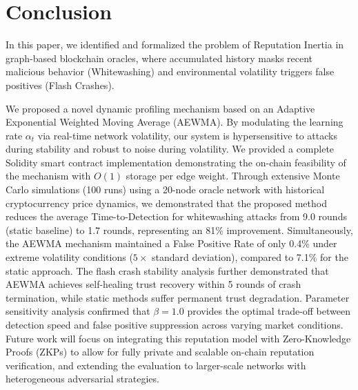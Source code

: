 \documentclass{ieeeaccess}
\begin{document}
\section{Conclusion}
\label{sec:conclusion}
In this paper, we identified and formalized the problem of Reputation Inertia in graph-based blockchain oracles, where accumulated history masks recent malicious behavior (Whitewashing) and environmental volatility triggers false positives (Flash Crashes).

We proposed a novel dynamic profiling mechanism based on an Adaptive Exponential Weighted Moving Average (AEWMA). By modulating the learning rate $\alpha_t$ via real-time network volatility, our system is hypersensitive to attacks during stability and robust to noise during volatility. We provided a complete Solidity smart contract implementation demonstrating the on-chain feasibility of the mechanism with $O(1)$ storage per edge weight. Through extensive Monte Carlo simulations (100 runs) using a 20-node oracle network with historical cryptocurrency price dynamics, we demonstrated that the proposed method reduces the average Time-to-Detection for whitewashing attacks from 9.0 rounds (static baseline) to 1.7 rounds, representing an 81\% improvement. Simultaneously, the AEWMA mechanism maintained a False Positive Rate of only 0.4\% under extreme volatility conditions ($5\times$ standard deviation), compared to 7.1\% for the static approach. The flash crash stability analysis further demonstrated that AEWMA achieves self-healing trust recovery within 5 rounds of crash termination, while static methods suffer permanent trust degradation. Parameter sensitivity analysis confirmed that $\beta=1.0$ provides the optimal trade-off between detection speed and false positive suppression across varying market conditions. Future work will focus on integrating this reputation model with Zero-Knowledge Proofs (ZKPs) to allow for fully private and scalable on-chain reputation verification, and extending the evaluation to larger-scale networks with heterogeneous adversarial strategies.




\EOD
\end{document}
